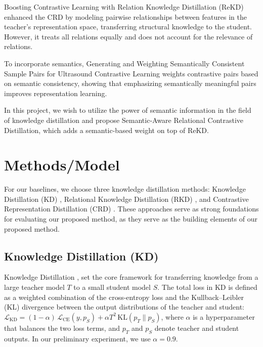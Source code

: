 \documentclass{article}
\begin{document}
Boosting Contrastive Learning with Relation Knowledge Distillation (ReKD) \citep{RKDCL_zheng2021boostingcontrastivelearningrelation} enhanced the CRD by modeling pairwise relationships between features in the teacher’s representation space, transferring structural knowledge to the student. However, it treats all relations equally and does not account for the relevance of relations. 

To incorporate semantics, Generating and Weighting Semantically Consistent Sample Pairs for Ultrasound Contrastive Learning \citep{semantic_chen2022generatingweightingsemanticallyconsistent} weights contrastive pairs based on semantic consistency, showing that emphasizing semantically meaningful pairs improves representation learning. 

In this project, we wish to utilize the power of semantic information in the field of knowledge distillation and propose Semantic-Aware Relational Contrastive Distillation, which adds a semantic-based weight on top of ReKD.

\section{Methods/Model}
For our baselines, we choose three knowledge distillation methods: Knowledge Distillation (KD) \citep{hinton2015distilling}, Relational Knowledge Distillation (RKD) \citep{rkd_park2019relational}, and Contrastive Representation Distillation (CRD) \citep{crd_tian2022contrastiverepresentationdistillation}. 
These approaches serve as strong foundations for evaluating our proposed method, as they serve as the building elements of our proposed method.

\subsection{Knowledge Distillation (KD)}
Knowledge Distillation \citep{hinton2015distilling}, set the core framework for transferring knowledge from a large teacher model $T$ to a small student model $S$. 
The total loss in KD is defined as a weighted combination of the cross-entropy loss and the Kullback--Leibler (KL) divergence between the output distributions of the teacher and student:
$\mathcal{L}_{\text{KD}} = (1 - \alpha)\, \mathcal{L}_{\text{CE}}(y, p_S) + \alpha T^2 \, 
\text{KL}(p_T \| p_S)$,
where $\alpha$ is a hyperparameter that balances the two loss terms, and $p_T$ and $p_S$ denote teacher and student outputs. In our preliminary experiment, we use $\alpha = 0.9$.
\end{document}
